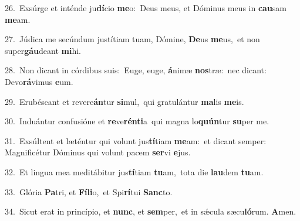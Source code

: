 {\numbfont\textcolor{\numbcolor}{26.}}~Exsúrge et inténde ju\-\textbf{dí}\-cio \textbf{me}\-o:~\star Deus meus, et Dóminus meus in \textbf{cau}\-sam \textbf{me}\-am.\par
{\numbfont\textcolor{\numbcolor}{27.}}~Júdica me secúndum justítiam tuam, Dómine, \textbf{De}\-us \textbf{me}\-us,~\star et non super\-\textbf{gáu}\-deant \textbf{mi}\-hi.\par
{\numbfont\textcolor{\numbcolor}{28.}}~Non dicant in córdibus suis:~\dagger Euge, euge, \textbf{á}\-nimæ \textbf{nos}\-træ:~\star nec dicant: Devo\-\textbf{rá}\-vimus \textbf{e}\-um.\par
{\numbfont\textcolor{\numbcolor}{29.}}~Erubéscant et revere\-\textbf{án}\-tur \textbf{si}\-mul,~\star qui gratulántur \textbf{ma}\-lis \textbf{me}\-is.\par
{\numbfont\textcolor{\numbcolor}{30.}}~Induántur confusióne et \textbf{re}\-ve\-\textbf{rén}\-\textbf{ti}a~\star qui magna lo\-\textbf{quún}\-tur \textbf{su}\-per me.\par
{\numbfont\textcolor{\numbcolor}{31.}}~Exsúltent et læténtur qui volunt jus\-\textbf{tí}\-tiam \textbf{me}\-am:~\star et dicant semper: Magnificétur Dóminus qui volunt pacem \textbf{ser}\-vi \textbf{e}\-jus.\par
{\numbfont\textcolor{\numbcolor}{32.}}~Et lingua mea meditábitur jus\-\textbf{tí}\-tiam \textbf{tu}\-am,~\star tota die \textbf{lau}\-dem \textbf{tu}\-am.\par
{\numbfont\textcolor{\numbcolor}{33.}}~Glória \textbf{Pa}\-tri, et \textbf{Fí}\-\textbf{li}o,~\star et Spi\-\textbf{rí}\-tui \textbf{Sanc}\-to.\par
{\numbfont\textcolor{\numbcolor}{34.}}~Sicut erat in princípio, et \textbf{nunc}\-, et \textbf{sem}\-per,~\star et in sǽcula sæcu\-\textbf{ló}\-rum. \textbf{A}\-men.\par
